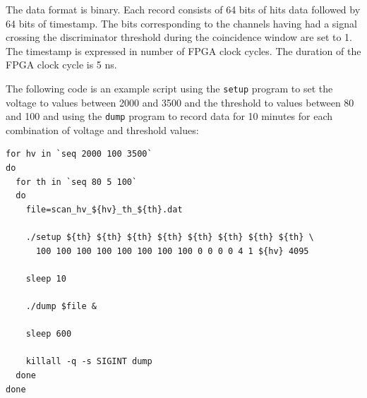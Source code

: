 \documentclass[12pt, a4paper]{article}
\begin{document}
The data format is binary. Each record consists of 64 bits of hits data followed by 64 bits of timestamp. The bits corresponding to the channels having had a signal crossing the discriminator threshold during the coincidence window are set to 1. The timestamp is expressed in number of FPGA clock cycles. The duration of the FPGA clock cycle is 5 ns.

The following code is an example script using the \texttt{setup} program to set the voltage to values between 2000 and 3500 and the threshold to values between 80 and 100 and using the \texttt{dump} program to record data for 10 minutes for each combination of voltage and threshold values:
\vspace{-1ex}
\begin{verbatim}
for hv in `seq 2000 100 3500`
do
  for th in `seq 80 5 100`
  do
    file=scan_hv_${hv}_th_${th}.dat

    ./setup ${th} ${th} ${th} ${th} ${th} ${th} ${th} ${th} \
      100 100 100 100 100 100 100 100 0 0 0 0 4 1 ${hv} 4095

    sleep 10

    ./dump $file &

    sleep 600

    killall -q -s SIGINT dump
  done
done
\end{verbatim}

\newpage

\printbibliography
\end{document}
